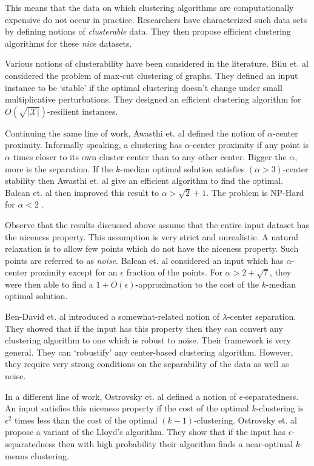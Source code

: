 \documentclass[letterpaper,12pt,titlepage,oneside,final]{book}
\newcommand{\mc}{\mathcal}
\begin{document}
This means that the data on which clustering algorithms are computationally expensive do not occur in practice. Researchers have characterized such data sets by defining notions of \textit{clusterable} data. They then propose efficient clustering algorithms for these {\em nice} datasets.

Various notions of clusterability have been considered in the literature. Bilu et. al \cite{bilu2012stable} considered the problem of max-cut clustering of graphs. They defined an input instance to be `stable' if the optimal clustering doesn't change under small multiplicative perturbations. They designed an efficient clustering algorithm for $O(\sqrt{|\mc X|})$-resilient instances. 

Continuing the same line of work, Awasthi et. al \cite{awasthi2012center} defined the notion of $\alpha$-center proximity. Informally speaking, a clustering has $\alpha$-center proximity if any point is $\alpha$ times closer to its own cluster center than to any other center. Bigger the $\alpha$, more is the separation. If the $k$-median optimal solution satisfies $(\alpha > 3)$-center stability then Awasthi et. al \cite{awasthi2012center} give an efficient algorithm to find the optimal. Balcan et. al \cite{balcan2012clustering} then improved this result to $\alpha > \sqrt{2}+1$. The problem is NP-Hard for $\alpha < 2$ \cite{ben2014data}. 

Observe that the results discussed above assume that the entire input dataset has the niceness property. This assumption is very strict and unrealistic. A natural relaxation is to allow few points which do not have the niceness property. Such points are referred to as \textit{noise}. Balcan et. al \cite{balcan2012clustering} considered an input which has $\alpha$-center proximity except for an $\epsilon$ fraction of the points. For $\alpha > 2 + \sqrt{7}$, they were then able to find a $1+O(\epsilon)$-approximation to the cost of the $k$-median optimal solution. 

Ben-David et. al \cite{ben2014clustering} introduced a somewhat-related notion of $\lambda$-center separation. They showed that if the input has this property then they can convert any clustering algorithm to one which is robust to noise. Their framework is very general. They can `robustify' any center-based clustering algorithm. However, they require very strong conditions on the separability of the data as well as noise. 

In a different line of work, Ostrovsky et. al \cite{ostrovsky2006effectiveness} defined a notion of $\epsilon$-separatedness. An input satisfies this niceness property if the cost of the optimal $k$-clustering is $\epsilon^2$ times less than the cost of the optimal $(k-1)$-clustering. Ostrovsky et. al \cite{ostrovsky2006effectiveness} propose a variant of the Lloyd's algorithm. They show that if the input has $\epsilon$-separatedness then with high probability their algorithm finds a near-optimal $k$-means clustering.
\end{document}
